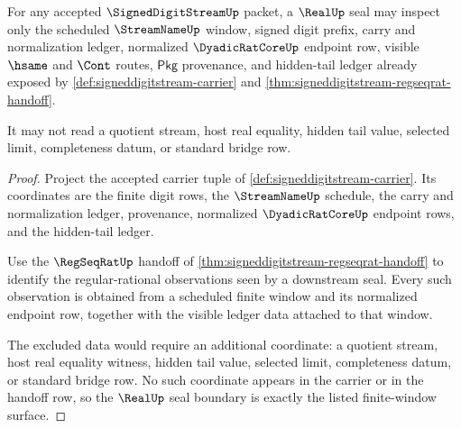 \begin{theorem}
\label{thm:signeddigitstream-real-seal-finite-window-boundary}
For any accepted $\SignedDigitStreamUp$ packet, a $\RealUp$ seal may inspect only the scheduled $\StreamNameUp$ window, signed digit prefix, carry and normalization ledger, normalized $\DyadicRatCoreUp$ endpoint row, visible $\hsame$ and $\Cont$ routes, $\mathsf{Pkg}$ provenance, and hidden-tail ledger already exposed by \autoref{def:signeddigitstream-carrier} and \autoref{thm:signeddigitstream-regseqrat-handoff}.

It may not read a quotient stream, host real equality, hidden tail value, selected limit, completeness datum, or standard bridge row.
\end{theorem}
\begin{proof}
Project the accepted carrier tuple of \autoref{def:signeddigitstream-carrier}. Its coordinates are the finite digit rows, the $\StreamNameUp$ schedule, the carry and normalization ledger, provenance, normalized $\DyadicRatCoreUp$ endpoint rows, and the hidden-tail ledger.

Use the $\RegSeqRatUp$ handoff of \autoref{thm:signeddigitstream-regseqrat-handoff} to identify the regular-rational observations seen by a downstream seal. Every such observation is obtained from a scheduled finite window and its normalized endpoint row, together with the visible ledger data attached to that window.

The excluded data would require an additional coordinate: a quotient stream, host real equality witness, hidden tail value, selected limit, completeness datum, or standard bridge row. No such coordinate appears in the carrier or in the handoff row, so the $\RealUp$ seal boundary is exactly the listed finite-window surface.
\end{proof}

